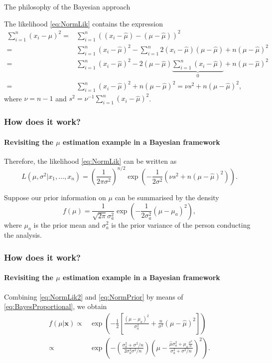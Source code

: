 \documentclass[10pt]{beamer}
\theoremstyle{definition}
\begin{document}
\begin{section}{The philosophy of the Bayesian approach}
\begin{frame}[fragile]
The likelihood \eqref{eq:NormLik} contains the expression
\begin{equation}
\label{eq:NormLik1}
\begin{split} \sum_{i=1}^{n}(x_i-\mu)^2= &
\sum_{i=1}^{n}\left((x_i-\hat{\mu})-(\mu-\hat{\mu})\right)^2\\
=&\sum_{i=1}^{n}(x_i-\hat{\mu})^2-\sum_{i=1}^{n}2(x_i-\hat{\mu})(\mu-\hat{\mu})+n(\mu-\hat{\mu})^2\\=&\sum_{i=1}^{n}(x_i-\hat{\mu})^2-2(\mu-\hat{\mu})\underbrace{\sum_{i=1}^{n}(x_i-\hat{\mu})}_{0}+n(\mu-\hat{\mu})^2\\
=&\sum_{i=1}^{n}(x_i-\hat{\mu})^2+n(\mu-\hat{\mu})^2 = \nu s^2+n(\mu-\hat{\mu})^2,
\end{split}
\end{equation}
where $\nu=n-1$ and $s^2=\nu^{-1}\sum_{i=1}^{n}(x_i-\hat{\mu})^2$.
\end{frame}

\begin{frame}[fragile]
\frametitle{How does it work?}
\framesubtitle{Revisiting the $ \mu $ estimation example in a Bayesian framework}
Therefore, the likelihood \eqref{eq:NormLik} can be written as
\begin{equation}
\label{eq:NormLik2}
L(\mu,\sigma^2|x_1,\ldots,x_n)=\left( \frac{1}{2\pi\sigma^2}
\right)^{n/2}\exp\left(-\frac{1}{2\sigma^2}\left(\nu
s^2+n(\mu-\hat{\mu})^2\right)\right).
\end{equation} \bigskip

Suppose our prior information on $\mu$ can be summarised by the density
\begin{equation}
\label{eq:NormPrior}
f(\mu)=\frac{1}{\sqrt{2\pi}\sigma^2_a}\exp\left(
-\frac{1}{2\sigma^2_a}(\mu-\mu_a)^2 \right),
\end{equation}
where $\mu_a$ is the prior mean and $\sigma_a^2$ is the prior variance of the person conducting the analysis.
\end{frame}

\begin{frame}[fragile]
\frametitle{How does it work?}
\framesubtitle{Revisiting the $ \mu $ estimation example in a Bayesian framework}
Combining \eqref{eq:NormLik2} and
\eqref{eq:NormPrior} by means of \eqref{eq:BayesProportional},
we obtain \begin{equation}
\label{NormPosterior} \begin{split}
f(\mu|\mathbf{x})\propto & \exp\left( -\frac{1}{2}\left[
\frac{(\mu-\mu_a)^2}{\sigma_a^2}+\frac{n}{\sigma^2}(\mu-\hat{\mu})^2
\right] \right) \\ \propto & \exp \left( -\left(
\frac{\sigma_a^2+\sigma^2/n}{2\sigma^2_a\sigma^2/n} \right)\left(
\mu-\frac{\hat{\mu}\sigma^2_a+\mu_a\frac{\sigma^2}{n}}{\sigma^2_a+\sigma^2/n}
\right)^2 \right). \end{split}
\end{equation}\bigskip


\end{frame}
\end{section}
\end{document}
